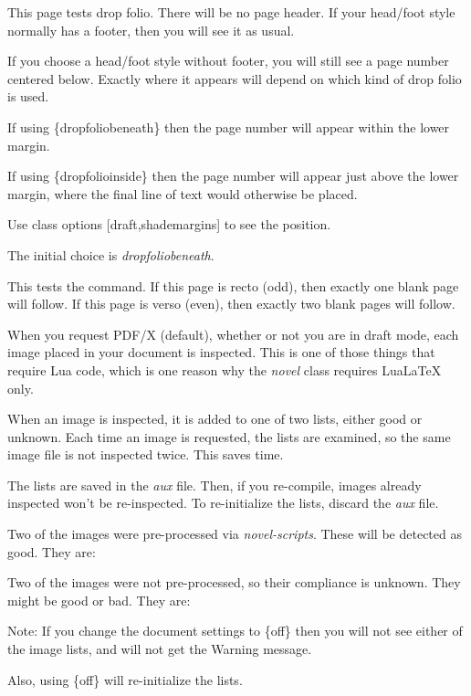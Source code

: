 \documentclass[test,shademargins,draft]{novel} %
\begin{document}
\clearpage



\thispagestyle{dropfoliobeneath} %

This page tests drop folio. There will be no page header. If your head/foot style normally has a footer, then you will see it as usual.

If you choose a head/foot style without footer, you will still see a page number centered below. Exactly where it appears will depend on which kind of drop folio is used.

If using \string\thispagestyle\{dropfoliobeneath\} then the page number will appear within the lower margin.

If using \string\thispagestyle\{dropfolioinside\} then the page number will appear just above the lower margin, where the final line of text would otherwise be placed. 

Use class options [draft,shademargins] to see the position.

The initial choice is \textit{dropfoliobeneath}.

\clearpage


This tests the \string\cleartoend\space command. If this page is recto (odd), then exactly one blank page will follow. If this page is verso (even), then exactly two blank pages will follow.

\null\null


When you request PDF/X (default), whether or not you are in draft mode, each image placed in your document is inspected. This is one of those things that require Lua code, which is one reason why the \textit{novel} class requires LuaLaTeX only.

When an image is inspected, it is added to one of two lists, either good or unknown. Each time an image is  requested, the lists are examined, so the same image file is not inspected twice. This saves time.

The lists are saved in the \textit{aux} file. Then, if you re-compile, images already inspected won't be re-inspected. To re-initialize the lists, discard the \textit{aux} file.

\null

Two of the images were pre-processed via \textit{novel-scripts}. These will be detected as good. They are:

\makeatletter\@AllGoodImages\makeatother

\null

Two of the images were not pre-processed, so their compliance is unknown. They might be good or bad. They are:

 \makeatletter\@UnknownImages\makeatother

\null

Note: If you change the document settings to \string\SetPDFX\{off\} then you will not see either of the image lists, and will not get the Warning message.

Also, using \string\SetPDFX\{off\} will re-initialize the lists.
\end{document}
